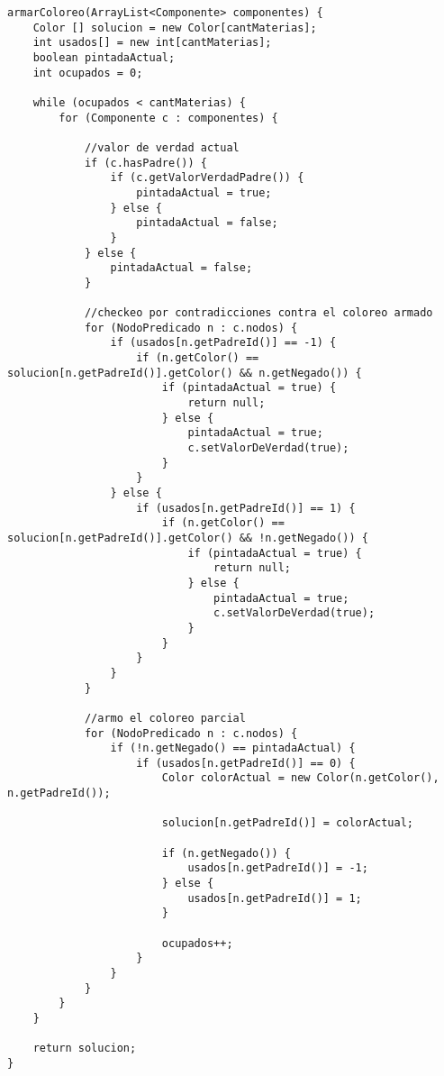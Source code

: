 \begin{verbatim}
armarColoreo(ArrayList<Componente> componentes) {
    Color [] solucion = new Color[cantMaterias];
    int usados[] = new int[cantMaterias];
    boolean pintadaActual;
    int ocupados = 0;
    
    while (ocupados < cantMaterias) {
        for (Componente c : componentes) {

            //valor de verdad actual
            if (c.hasPadre()) {
                if (c.getValorVerdadPadre()) {
                    pintadaActual = true;
                } else {
                    pintadaActual = false;
                }
            } else {
                pintadaActual = false;
            }
            
            //checkeo por contradicciones contra el coloreo armado
            for (NodoPredicado n : c.nodos) {
                if (usados[n.getPadreId()] == -1) {
                    if (n.getColor() == solucion[n.getPadreId()].getColor() && n.getNegado()) {
                        if (pintadaActual = true) { 
                            return null;
                        } else {
                            pintadaActual = true;
                            c.setValorDeVerdad(true);
                        }
                    }
                } else {
                    if (usados[n.getPadreId()] == 1) {
                        if (n.getColor() == solucion[n.getPadreId()].getColor() && !n.getNegado()) {
                            if (pintadaActual = true) { 
                                return null;
                            } else {
                                pintadaActual = true;
                                c.setValorDeVerdad(true);
                            }
                        }
                    }
                }
            }
            
            //armo el coloreo parcial
            for (NodoPredicado n : c.nodos) {
                if (!n.getNegado() == pintadaActual) {
                    if (usados[n.getPadreId()] == 0) {
                        Color colorActual = new Color(n.getColor(), n.getPadreId());
                        
                        solucion[n.getPadreId()] = colorActual;
                        
                        if (n.getNegado()) {
                            usados[n.getPadreId()] = -1;
                        } else {
                            usados[n.getPadreId()] = 1;
                        }
                        
                        ocupados++;
                    }
                }
            }
        }
    }
    
    return solucion;
}
    \end{verbatim}
    

